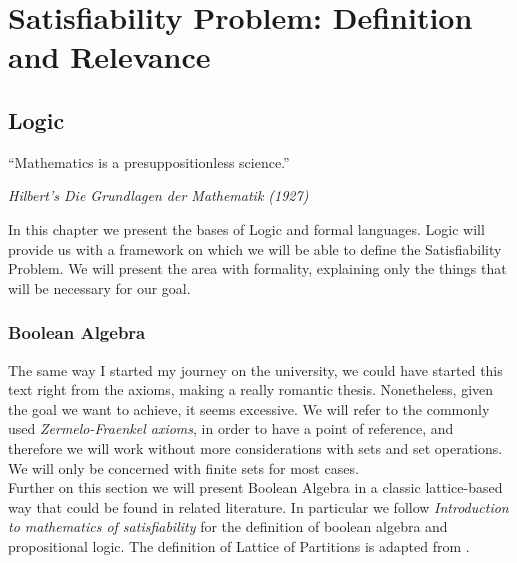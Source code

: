 
\part{Satisfiability Problem: Definition and Relevance} %

\label{Chapter1} %


\newcommand{\keyword}[1]{\textbf{#1}}
\newcommand{\tabhead}[1]{\textbf{#1}}
\newcommand{\code}[1]{\texttt{#1}}
\newcommand{\file}[1]{\texttt{\bfseries#1}}
\newcommand{\option}[1]{\texttt{\itshape#1}}


\chapter{Logic}

\epigraph{“Mathematics is a presuppositionless science.” }{\textit{Hilbert's Die Grundlagen der Mathematik (1927)}}

In this chapter we present the bases of Logic and formal languages. Logic will provide us with a framework on which we will be able to define the Satisfiability Problem. We will present the area with formality, explaining only the things that will be necessary for our goal.


\section{Boolean Algebra}

The same way I started my journey on the university, we could have started this text right from the axioms, making a really romantic thesis. Nonetheless, given the goal we want to achieve, it seems excessive. We will refer to the commonly used \emph{Zermelo-Fraenkel axioms}, in order to have a point of reference, and therefore we will work without more considerations with sets and set operations. We will only be concerned with finite sets for most cases.\\

Further on this section we will present Boolean Algebra in a classic lattice-based way that could be found in related literature. In particular we follow  \emph{Introduction to mathematics of satisfiability}\cite{marek2009introduction} for the definition of boolean algebra and propositional logic. The definition of Lattice of Partitions is adapted from \cite{sakallah2009symmetry}.

